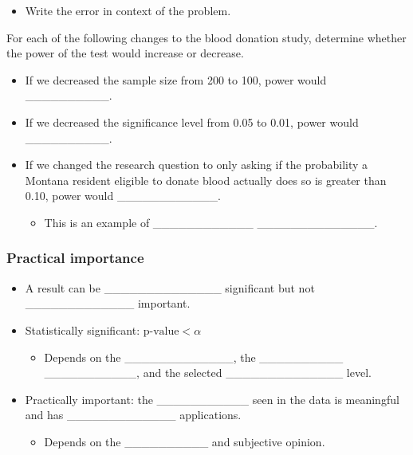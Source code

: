 \documentclass[
]{report}
\providecommand{\tightlist}{%
  \setlength{\itemsep}{0pt}\setlength{\parskip}{0pt}}
\begin{document}
\vspace{0.2in}

\begin{itemize}
\tightlist
\item
  Write the error in context of the problem.
\end{itemize}

\vspace{0.5in}

For each of the following changes to the blood donation study, determine whether the power of the test would increase or decrease.


\begin{itemize}
\item
  If we decreased the sample size from 200 to 100, power would \_\_\_\_\_\_\_\_\_\_.
\item
  If we decreased the significance level from 0.05 to 0.01, power would \_\_\_\_\_\_\_\_\_\_.
\item
  If we changed the research question to only asking if the probability a Montana resident eligible to donate blood actually does so is greater than 0.10, power would \_\_\_\_\_\_\_\_\_\_\_\_.

  \begin{itemize}
  \tightlist
  \item
    This is an example of \_\_\_\_\_\_\_\_\_\_\_\_ \_\_\_\_\_\_\_\_\_\_\_\_\_\_.
  \end{itemize}
\end{itemize}


\hypertarget{practical-importance}{%
\subsubsection*{Practical importance}\label{practical-importance}}

\begin{itemize}
\item
  A result can be \_\_\_\_\_\_\_\_\_\_\_\_\_\_ significant but not \_\_\_\_\_\_\_\_\_\_\_\_\_ important.
\item
  Statistically significant: \(\text{p-value} < \alpha\)

  \begin{itemize}
  \tightlist
  \item
    Depends on the \_\_\_\_\_\_\_\_\_\_\_\_\_, the \_\_\_\_\_\_\_\_\_\_ \_\_\_\_\_\_\_\_\_\_\_, and the selected \_\_\_\_\_\_\_\_\_\_\_\_\_\_ level.
  \end{itemize}
\item
  Practically important: the \_\_\_\_\_\_\_\_\_\_\_ seen in the data is
  meaningful and has \_\_\_\_\_\_\_\_\_\_\_\_\_
  applications.

  \begin{itemize}
  \tightlist
  \item
    Depends on the \_\_\_\_\_\_\_\_\_\_ and subjective opinion.
  \end{itemize}
\end{itemize}
\end{document}
